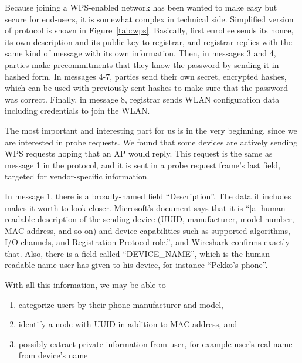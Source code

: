 \documentclass[12pt,a4paper,oneside,pdftex]{report}
\begin{document}
Because joining a WPS-enabled network has been wanted to make easy but secure for end-users, it is somewhat complex in technical side. Simplified version of protocol is shown in Figure~\ref{tab:wps}. Basically, first enrollee sends its nonce, its own description and its public key to registrar, and registrar replies with the same kind of message with its own information. Then, in messages 3 and 4, parties make precommitments that they know the password by sending it in hashed form. In messages 4-7, parties send their own secret, encrypted hashes, which can be used with previously-sent hashes to make sure that the password was correct. Finally, in message 8, registrar sends WLAN configuration data including credentials to join the WLAN.

The most important and interesting part for us is in the very beginning, since we are interested in probe requests. We found that some devices are actively sending WPS requests hoping that an AP would reply. This request is the same as message 1 in the protocol, and it is sent in a probe request frame's last field, targeted for vendor-specific information.

In message 1, there is a broadly-named field ``Description''. The data it includes makes it worth to look closer. Microsoft's document says that it is ``[a] human-readable description of the sending device (UUID, manufacturer, model number, MAC address, and so on) and device capabilities such as supported algorithms, I/O channels, and Registration Protocol role.'', and Wireshark confirms exactly that. Also, there is a field called ``DEVICE\_NAME'', which is the human-readable name user has given to his device, for instance ``Pekko's phone''.

With all this information, we may be able to
\begin{enumerate}
    \item categorize users by their phone manufacturer and model,
    \item identify a node with UUID in addition to MAC address, and
    \item possibly extract private information from user, for example user's real name from device's name
\end{enumerate}


\end{document}
